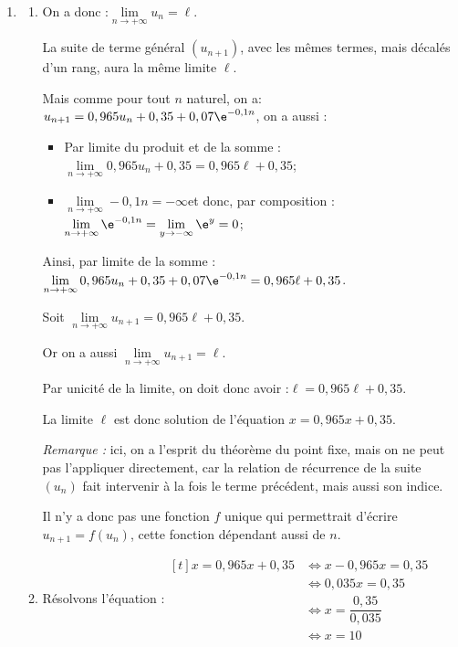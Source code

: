 \begin{enumerate}
			\item \begin{enumerate}
				\item On a donc :\quad $\lim\limits_{n \to +\infty} u_n = \ell$.

				La suite de terme général $(u_{n+1})$, avec les mêmes termes, mais décalés d'un rang, aura la même limite $\ell$.

				Mais comme pour tout $n$ naturel, on a:\quad $u_{n+1} = 0,965u_n + 0,35 + 0,07\e^{-0,1n}$, on a aussi :

				\begin{itemize}[label=\textbullet~]
					\item Par limite du produit et de la somme : $\lim\limits_{n \to +\infty} 0,965u_n + 0,35 = 0,965\ell + 0,35$;
					\item $\lim\limits_{n \to +\infty} -0,1n = -\infty$\quad et donc, par composition :\quad $\lim\limits_{n \to +\infty} \e^{-0,1n} = \lim\limits_{y \to -\infty} \e^{y} = 0$;
				\end{itemize}

				Ainsi, par limite de la somme :\quad $\lim\limits_{n \to +\infty} 0,965u_n + 0,35 +0,07\e^{-0,1n} = 0,965\ell + 0,35$.

				Soit \quad $\lim\limits_{n \to +\infty} u_{n+1} = 0,965\ell + 0,35$.

				Or on a aussi \quad $\lim\limits_{n \to +\infty} u_{n+1} = \ell$.

				Par unicité de la limite, on doit donc avoir :\quad $\ell = 0,965\ell + 0,35$.

				La limite $\ell $ est donc solution de l'équation \quad $x=0,965 x+0,35$.

				\emph{Remarque :} ici, on a l'esprit du théorème du point fixe, mais on ne peut pas l'appliquer directement, car la relation de récurrence de la suite $(u_n)$ fait intervenir à la fois le terme précédent, mais aussi son indice.

				Il n'y a donc pas une fonction $f$ unique qui permettrait d'écrire $u_{n+1} = f(u_n)$, cette fonction dépendant aussi de $n$.

				\item Résolvons l'équation :\quad $\begin{aligned}[t]
					x = 0,965x + 0,35
						&\iff x - 0,965x = 0,35\\
						&\iff 0,035x = 0,35\\
						&\iff x = \dfrac{0,35}{0,035}\\
						&\iff x = 10
				\end{aligned}$


\end{enumerate}
\end{enumerate}
